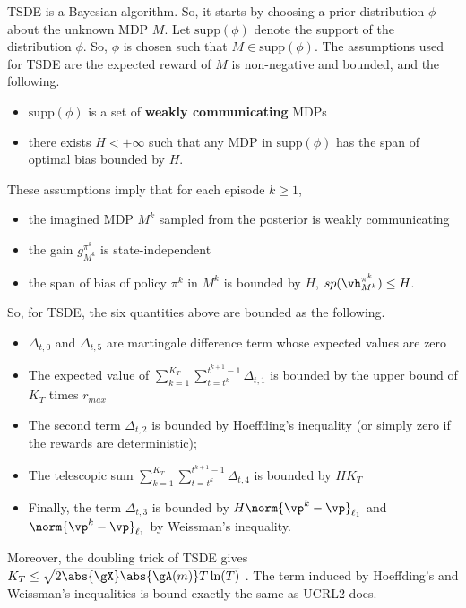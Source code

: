 TSDE is a Bayesian algorithm. So, it starts by choosing a prior distribution $\phi$ about the unknown MDP $M$.
Let $\mathrm{supp}(\phi)$ denote the support of the distribution $\phi$.
So, $\phi$ is chosen such that $M\in\mathrm{supp}(\phi)$.
The assumptions used for TSDE are the expected reward of $M$ is non-negative and bounded, and the following.
\begin{itemize}
    \item $\mathrm{supp}(\phi)$ is a set of \textbf{weakly communicating} MDPs
    \item there exists $H<+\infty$ such that any MDP in $\mathrm{supp}(\phi)$ has the span of optimal bias bounded by $H$.
\end{itemize}
These assumptions imply that for each episode $k\ge1$,
\begin{itemize}
    \item the imagined MDP $M^k$ sampled from the posterior is weakly communicating
    \item the gain $g^{\pi^k}_{M^k}$ is state-independent
    \item the span of bias of policy $\pi^k$ in $M^k$ is bounded by $H$, $sp(\vh^{\pi^k}_{M^k})\le H$.
\end{itemize}
So, for TSDE, the six quantities above are bounded as the following.
\begin{itemize}
    \item $\Delta_{t,0}$ and $\Delta_{t,5}$ are martingale difference term whose expected values are zero
    \item The expected value of $\sum_{k=1}^{K_T}\sum_{t=t^k}^{t^{k+1}-1}\Delta_{t,1}$ is bounded by the upper bound of $K_T$ times $r_{max}$
    \item The second term $\Delta_{t,2}$ is bounded by Hoeffding's inequality (or simply zero if the rewards are deterministic);
    \item The telescopic sum $\sum_{k=1}^{K_T}\sum_{t=t^k}^{t^{k+1}-1} \Delta_{t,4}$ is bounded by $HK_T$
    \item Finally, the term $\Delta_{t,3}$ is bounded by $H\norm{\vp^k-\vp}_{\ell_1}$ and $\norm{\vp^k-\vp}_{\ell_1}$ by Weissman's inequality.
\end{itemize}

Moreover, the doubling trick of TSDE gives $K_T\le \sqrt{2\abs{\gX}\abs{\gA(m)}T\ln(T)}$ \cite[Lemma~1]{ouyang2017learning}.
The term induced by Hoeffding's and Weissman's inequalities is bound exactly the same as UCRL2 does.

